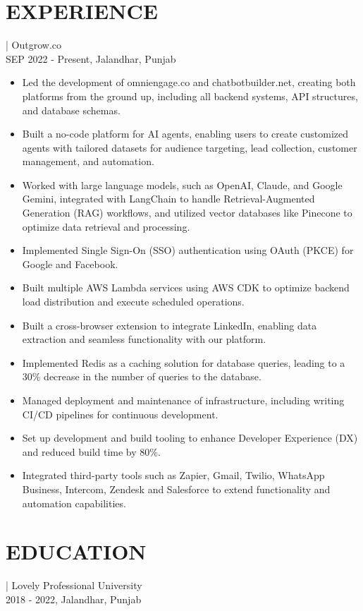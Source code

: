 \documentclass[]{resume}
\begin{document}
\section{EXPERIENCE}
 | \textrm{Outgrow.co}\\
SEP 2022 - Present, Jalandhar, Punjab
\begin{itemize}
  \item Led the development of omniengage.co and chatbotbuilder.net, creating both platforms from the ground up, including all backend systems, API structures, and database schemas.
  \item Built a no-code platform for AI agents, enabling users to create customized agents with tailored datasets for audience targeting, lead collection, customer management, and automation.
  \item Worked with large language models, such as OpenAI, Claude, and Google Gemini, integrated with LangChain to handle Retrieval-Augmented Generation (RAG) workflows, and utilized vector databases like Pinecone to optimize data retrieval and processing.
  \item Implemented Single Sign-On (SSO) authentication using OAuth (PKCE) for Google and Facebook.
  \item Built multiple AWS Lambda services using AWS CDK to optimize backend load distribution and execute scheduled operations.
  \item Built a cross-browser extension to integrate LinkedIn, enabling data extraction and seamless functionality with our platform.
  \item Implemented Redis as a caching solution for database queries, leading to a 30\% decrease in the number of queries to the database.
  \item Managed deployment and maintenance of infrastructure, including writing CI/CD pipelines for continuous development.
  \item Set up development and build tooling to enhance Developer Experience (DX) and reduced build time by 80\%.
  \item Integrated third-party tools such as Zapier, Gmail, Twilio, WhatsApp Business, Intercom, Zendesk and Salesforce to extend functionality and automation capabilities.
\end{itemize}

\section{EDUCATION}
 | \textrm{Lovely Professional University}\\
2018 - 2022, Jalandhar, Punjab
\end{document}
